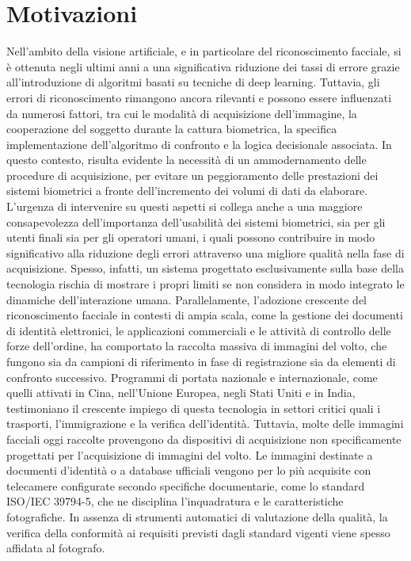 \documentclass[12pt,a4paper,openright,twoside]{book}
\begin{document}
\section{Motivazioni}
Nell'ambito della visione artificiale, e in particolare del riconoscimento facciale, si è ottenuta negli ultimi anni a una significativa riduzione dei tassi di errore grazie all'introduzione di algoritmi basati su tecniche di deep learning.
Tuttavia, gli errori di riconoscimento rimangono ancora rilevanti e possono essere influenzati da numerosi fattori, tra cui le modalità di acquisizione dell'immagine, la cooperazione del soggetto durante la cattura biometrica, la specifica implementazione dell'algoritmo di confronto e la logica decisionale associata.
In questo contesto, risulta evidente la necessità di un ammodernamento delle procedure di acquisizione, per evitare un peggioramento delle prestazioni dei sistemi biometrici a fronte dell'incremento dei volumi di dati da elaborare.
L'urgenza di intervenire su questi aspetti si collega anche a una maggiore consapevolezza dell'importanza dell'usabilità dei sistemi biometrici, sia per gli utenti finali sia per gli operatori umani, i quali possono contribuire in modo significativo alla riduzione degli errori attraverso una migliore qualità nella fase di acquisizione.
Spesso, infatti, un sistema progettato esclusivamente sulla base della tecnologia rischia di mostrare i propri limiti se non considera in modo integrato le dinamiche dell'interazione umana.
Parallelamente, l'adozione crescente del riconoscimento facciale in contesti di ampia scala, come la gestione dei documenti di identità elettronici, le applicazioni commerciali e le attività di controllo delle forze dell'ordine, ha comportato la raccolta massiva di immagini del volto, che fungono sia da campioni di riferimento in fase di registrazione sia da elementi di confronto successivo.
Programmi di portata nazionale e internazionale, come quelli attivati in Cina, nell'Unione Europea, negli Stati Uniti e in India, testimoniano il crescente impiego di questa tecnologia in settori critici quali i trasporti, l'immigrazione e la verifica dell'identità.
Tuttavia, molte delle immagini facciali oggi raccolte provengono da dispositivi di acquisizione non specificamente progettati per l'acquisizione di immagini del volto.
Le immagini destinate a documenti d'identità o a database ufficiali vengono per lo più acquisite con telecamere configurate secondo specifiche documentarie, come lo standard ISO/IEC 39794-5, che ne disciplina l'inquadratura e le caratteristiche fotografiche.
In assenza di strumenti automatici di valutazione della qualità, la verifica della conformità ai requisiti previsti dagli standard vigenti viene spesso affidata al fotografo.
\end{document}

